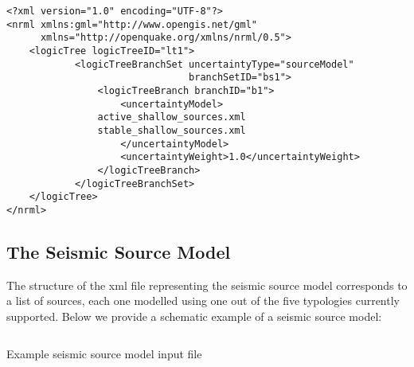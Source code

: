\begin{verbatim}
<?xml version="1.0" encoding="UTF-8"?>
<nrml xmlns:gml="http://www.opengis.net/gml"
      xmlns="http://openquake.org/xmlns/nrml/0.5">
    <logicTree logicTreeID="lt1">
            <logicTreeBranchSet uncertaintyType="sourceModel"
                                branchSetID="bs1">
                <logicTreeBranch branchID="b1">
                    <uncertaintyModel>
		        active_shallow_sources.xml
		        stable_shallow_sources.xml
                    </uncertaintyModel>
                    <uncertaintyWeight>1.0</uncertaintyWeight>
                </logicTreeBranch>
            </logicTreeBranchSet>
    </logicTree>
</nrml>
\end{verbatim}


\subsection{The Seismic Source Model}

The structure of the xml file representing the seismic source model
corresponds to a list of sources, each one modelled using one out of the five
typologies currently supported. Below we provide a schematic example of a
seismic source model:

\begin{listing}[htbp]
  \inputminted[firstline=1,firstnumber=1,fontsize=\footnotesize,frame=single,linenos,bgcolor=lightgray]{xml}{oqum/hazard/verbatim/input_sslt.xml}
  \caption{Example seismic source model input file}
  \label{lst:input_ssm}
\end{listing}
